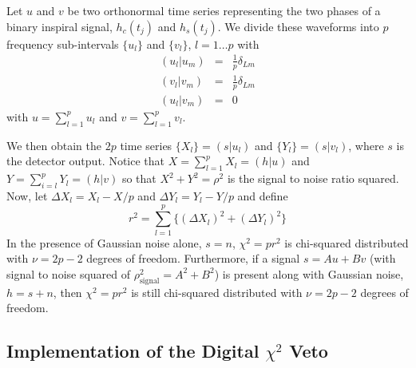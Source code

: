 Let $u$ and $v$ be two orthonormal time series representing the two phases of a
binary inspiral signal, $h_c(t_j)$ and $h_s(t_j)$.  We divide these waveforms
into $p$ frequency sub-intervals $\{u_l\}$ and $\{v_l\}$, $l=1\ldots p$ with
\begin{eqnarray}
  (u_l|u_m) &=& \frac{1}{p}\delta_{Lm} \\
  (v_l|v_m) &=& \frac{1}{p}\delta_{Lm} \\
  (u_l|v_m) &=& 0
\end{eqnarray}
with $u=\sum_{l=1}^p u_l$ and $v=\sum_{l=1}^p v_l$.

We then obtain the $2p$ time series $\{X_l\}=(s|u_l)$ and $\{Y_l\}=(s|v_l)$,
where $s$ is the detector output. Notice that  $X=\sum_{l=1}^p X_l=(h|u)$ and
$Y=\sum_{i=l}^p Y_l=(h|v)$ so that $X^2+Y^2=\rho^2$ is the signal to noise
ratio squared. Now, let $\Delta X_l=X_l-X/p$ and $\Delta Y_l=Y_l-Y/p$ and
define
\begin{equation}
  r^2 = \sum_{l=1}^p \bigl\{ (\Delta X_l)^2 + (\Delta Y_l)^2 \bigr\}
\end{equation}
In the presence of Gaussian noise alone, $s=n$, $\chi^2=pr^2$ is chi-squared
distributed with $\nu=2p-2$ degrees of freedom.  Furthermore, if a signal
$s=Au+Bv$ (with signal to noise squared of $\rho^2_{\mathrm{signal}}=A^2+B^2$) 
is present along with Gaussian noise, $h=s+n$, then $\chi^2=pr^2$ is still
chi-squared distributed with $\nu=2p-2$ degrees of freedom.

\subsection{Implementation of the Digital $\chi^2$ Veto}
\label{ss:chisqdisc}


